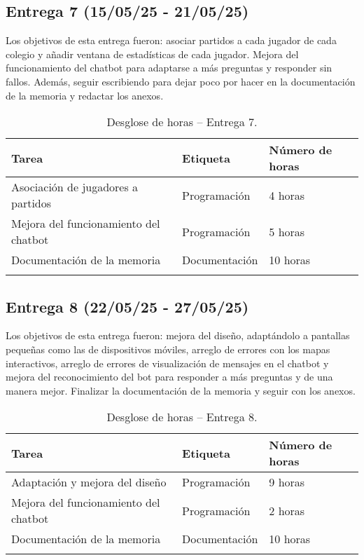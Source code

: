 \subsection{Entrega 7 (15/05/25 - 21/05/25)}

Los objetivos de esta entrega fueron: asociar partidos a cada jugador de cada colegio y añadir ventana de estadísticas de cada jugador. Mejora del funcionamiento del chatbot para adaptarse a más preguntas y responder sin fallos. Además, seguir escribiendo para dejar poco por hacer en la documentación de la memoria y redactar los anexos.

\begin{longtable}{@{} p{6cm} p{3cm} p{3cm} @{}}
  \toprule
  \rowcolor{gray!20}
  Tarea & Etiqueta & Número de horas \\ 
  \midrule
  \endhead
  Asociación de jugadores a partidos  & Programación  & 4 horas \\ 
  \midrule

  Mejora del funcionamiento del chatbot  & Programación  & 5 horas \\ 
  \midrule

  Documentación de la memoria & Documentación  &  10 horas \\ 
  \midrule

  \bottomrule
  \caption{Desglose de horas -- Entrega 7.}
\end{longtable}


\subsection{Entrega 8 (22/05/25 - 27/05/25)}

Los objetivos de esta entrega fueron: mejora del diseño, adaptándolo a pantallas pequeñas como las de dispositivos móviles, arreglo de errores con los mapas interactivos, arreglo de errores de visualización de mensajes en el chatbot y mejora del reconocimiento del bot para responder a más preguntas y de una manera mejor. Finalizar la documentación de la memoria y seguir con los anexos.

\begin{longtable}{@{} p{6cm} p{3cm} p{3cm} @{}}
  \toprule
  \rowcolor{gray!20}
  Tarea & Etiqueta & Número de horas \\ 
  \midrule
  \endhead
  Adaptación y mejora del diseño  & Programación  & 9 horas \\ 
  \midrule

  Mejora del funcionamiento del chatbot  & Programación  & 2 horas \\ 
  \midrule

  Documentación de la memoria & Documentación  &  10 horas \\ 
  \midrule

  \bottomrule
  \caption{Desglose de horas -- Entrega 8.}
\end{longtable}

